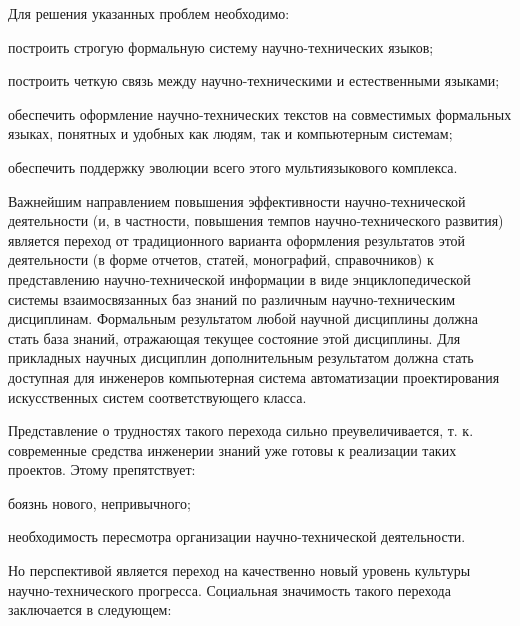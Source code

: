 \begin{SCn}
{Для решения указанных проблем необходимо:
\begin{scnitemize}
    \item построить строгую формальную систему научно-технических языков;
    \item построить четкую связь между научно-техническими и естественными языками; 
    \item обеспечить оформление научно-технических текстов на совместимых формальных языках, понятных и удобных как людям, так и компьютерным системам; 
    \item обеспечить поддержку эволюции всего этого мультиязыкового комплекса.
\end{scnitemize}

Важнейшим направлением повышения эффективности научно-технической деятельности (и, в частности, повышения темпов научно-технического развития) является переход от традиционного варианта оформления результатов этой деятельности (в форме отчетов, статей, монографий, справочников) к представлению научно-технической информации в виде энциклопедической системы взаимосвязанных баз знаний по различным научно-техническим дисциплинам. Формальным результатом любой научной дисциплины должна стать база знаний, отражающая текущее состояние этой дисциплины. 
Для прикладных научных дисциплин дополнительным результатом должна стать доступная для инженеров компьютерная система автоматизации проектирования искусственных систем соответствующего класса.

Представление о трудностях такого перехода сильно преувеличивается, т. к. современные средства инженерии знаний уже готовы к реализации таких проектов. Этому препятствует: 

\begin{scnitemize}
    \item боязнь нового, непривычного; 
    \item необходимость пересмотра организации научно-технической деятельности.
\end{scnitemize}

Но перспективой является переход на качественно новый уровень культуры научно-технического прогресса. Социальная значимость такого перехода заключается в следующем: 

}
\end{SCn}
